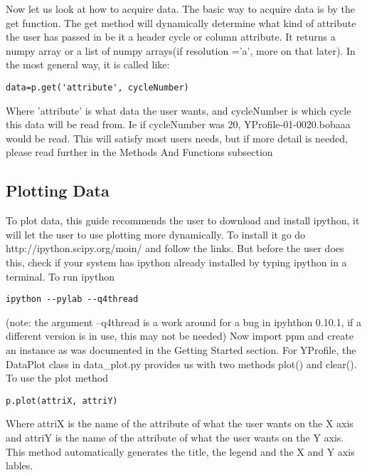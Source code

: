 Now let us look at how to acquire data.
\newline
The basic way to acquire data is by the get function. The get method will dynamically determine what kind of attribute the user has passed in
be it a header cycle or column attribute.  It returns a numpy array or a list of numpy arrays(if resolution ='a', more on that later).  In the most general way, it is called like:
\begin{verbatim}
data=p.get('attribute', cycleNumber)
\end{verbatim}
Where 'attribute' is what data the user wants, and cycleNumber is which cycle this data will be read from.  Ie if cycleNumber was 20, YProfile-01-0020.bobaaa would be read.
This will satisfy most users needs, but if more detail is needed, please read further in the Methods And Functions subsection

\subsection{Plotting Data}
To plot data, this guide recommends the user to download and install ipython, it will let the user to use plotting more dynamically. To install it go do http://ipython.scipy.org/moin/ and follow the links.
But before the user does this, check if your system has ipython already installed by typing ipython in a terminal.
\newline
To run ipython
\begin{verbatim}
ipython --pylab --q4thread
\end{verbatim}
(note: the argument --q4thread is a work around for a bug in ipyhthon 0.10.1, if a different version is in use, this may not be needed)
\newline
Now import ppm and create an instance as was documented in the Getting Started section.
For YProfile, the DataPlot class in  data\_plot.py provides us with two methods plot() and clear().
\newline
To use the plot method
\begin{verbatim}
p.plot(attriX, attriY)
\end{verbatim}
Where attriX is the name of the attribute of what the user wants on the X axis and attriY is the name of the attribute of what the user wants on the Y axis.
This method automatically generates the title, the legend and the X and Y axis lables.

